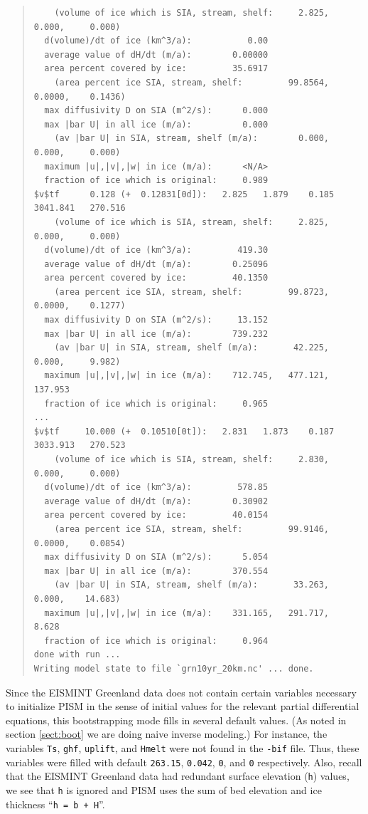 \documentclass[11pt,final]{amsart}
\begin{document}
\begin{quote}
\begin{verbatim}
    (volume of ice which is SIA, stream, shelf:     2.825,     0.000,     0.000)
  d(volume)/dt of ice (km^3/a):           0.00
  average value of dH/dt (m/a):        0.00000
  area percent covered by ice:         35.6917
    (area percent ice SIA, stream, shelf:         99.8564,    0.0000,    0.1436)
  max diffusivity D on SIA (m^2/s):      0.000
  max |bar U| in all ice (m/a):          0.000
    (av |bar U| in SIA, stream, shelf (m/a):        0.000,     0.000,     0.000)
  maximum |u|,|v|,|w| in ice (m/a):      <N/A>
  fraction of ice which is original:     0.989
$v$tf      0.128 (+  0.12831[0d]):   2.825   1.879    0.185   3041.841   270.516
    (volume of ice which is SIA, stream, shelf:     2.825,     0.000,     0.000)
  d(volume)/dt of ice (km^3/a):         419.30
  average value of dH/dt (m/a):        0.25096
  area percent covered by ice:         40.1350
    (area percent ice SIA, stream, shelf:         99.8723,    0.0000,    0.1277)
  max diffusivity D on SIA (m^2/s):     13.152
  max |bar U| in all ice (m/a):        739.232
    (av |bar U| in SIA, stream, shelf (m/a):       42.225,     0.000,     9.982)
  maximum |u|,|v|,|w| in ice (m/a):    712.745,   477.121,   137.953
  fraction of ice which is original:     0.965
...
$v$tf     10.000 (+  0.10510[0t]):   2.831   1.873    0.187   3033.913   270.523
    (volume of ice which is SIA, stream, shelf:     2.830,     0.000,     0.000)
  d(volume)/dt of ice (km^3/a):         578.85
  average value of dH/dt (m/a):        0.30902
  area percent covered by ice:         40.0154
    (area percent ice SIA, stream, shelf:         99.9146,    0.0000,    0.0854)
  max diffusivity D on SIA (m^2/s):      5.054
  max |bar U| in all ice (m/a):        370.554
    (av |bar U| in SIA, stream, shelf (m/a):       33.263,     0.000,    14.683)
  maximum |u|,|v|,|w| in ice (m/a):    331.165,   291.717,     8.628
  fraction of ice which is original:     0.964
done with run ... 
Writing model state to file `grn10yr_20km.nc' ... done.
\end{verbatim}
\end{quote}\normalsize

\noindent Since the EISMINT Greenland data does not contain certain variables necessary to initialize PISM in the sense of initial values for the relevant partial differential equations, this bootstrapping mode fills in several default values.  (As noted in section \ref{sect:boot} we are doing naive inverse modeling.)  For instance, the variables \verb|Ts|, \verb|ghf|, \verb|uplift|, and \verb|Hmelt| were not found in the \verb|-bif| file.  Thus, these variables were filled with default \verb|263.15|, \verb|0.042|, \verb|0|, and \verb|0| respectively. Also, recall that the EISMINT Greenland data had redundant surface elevation (\verb|h|) values, we see that \verb|h| is ignored and PISM uses the sum of bed elevation and ice thickness ``\verb|h = b + H|''.
\end{document}
